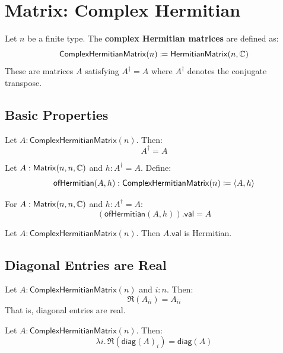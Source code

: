 \section{Matrix: Complex Hermitian}

\begin{definition}[ComplexHermitianMatrix]
Let $n$ be a finite type. The \textbf{complex Hermitian matrices} are defined as:
\[ \mathsf{ComplexHermitianMatrix}(n) \coloneqq \mathsf{HermitianMatrix}(n, \mathbb{C}) \]
These are matrices $A$ satisfying $A^\dagger = A$ where $A^\dagger$ denotes the conjugate transpose.
\end{definition}

\subsection{Basic Properties}

\begin{theorem}[conjTranspose\_eq]
Let $A : \mathsf{ComplexHermitianMatrix}(n)$. Then:
\[ A^\dagger = A \]
\end{theorem}

\begin{definition}[ofHermitian]
Let $A : \mathsf{Matrix}(n, n, \mathbb{C})$ and $h : A^\dagger = A$. Define:
\[ \mathsf{ofHermitian}(A, h) : \mathsf{ComplexHermitianMatrix}(n) \coloneqq \langle A, h \rangle \]
\end{definition}

\begin{lemma}
For $A : \mathsf{Matrix}(n, n, \mathbb{C})$ and $h : A^\dagger = A$:
\[ (\mathsf{ofHermitian}(A, h)).\mathsf{val} = A \]
\end{lemma}

\begin{theorem}
Let $A : \mathsf{ComplexHermitianMatrix}(n)$. Then $A.\mathsf{val}$ is Hermitian.
\end{theorem}

\subsection{Diagonal Entries are Real}

\begin{theorem}
Let $A : \mathsf{ComplexHermitianMatrix}(n)$ and $i : n$. Then:
\[ \Re(A_{ii}) = A_{ii} \]
That is, diagonal entries are real.
\end{theorem}

\begin{theorem}
Let $A : \mathsf{ComplexHermitianMatrix}(n)$. Then:
\[ \lambda i.\, \Re(\mathsf{diag}(A)_i) = \mathsf{diag}(A) \]
\end{theorem}


